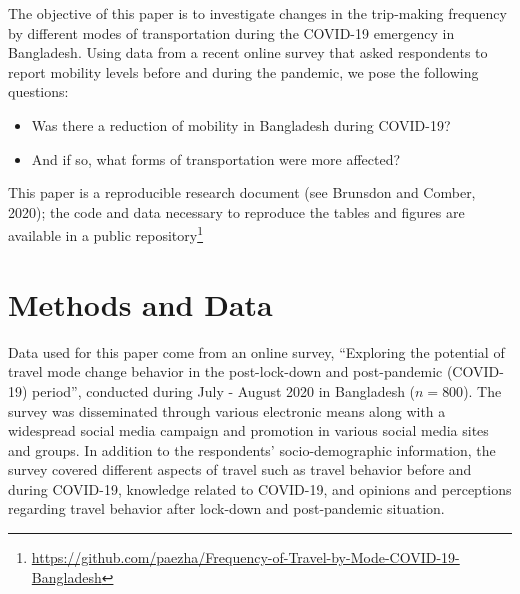 \documentclass[]{elsarticle} %
\providecommand{\tightlist}{%
  \setlength{\itemsep}{0pt}\setlength{\parskip}{0pt}}
\begin{document}
The objective of this paper is to investigate changes in the trip-making
frequency by different modes of transportation during the COVID-19
emergency in Bangladesh. Using data from a recent online survey that
asked respondents to report mobility levels before and during the
pandemic, we pose the following questions:

\begin{itemize}
\tightlist
\item
  Was there a reduction of mobility in Bangladesh during COVID-19?
\item
  And if so, what forms of transportation were more affected?
\end{itemize}

This paper is a reproducible research document (see Brunsdon and Comber,
2020); the code and data necessary to reproduce the tables and figures
are available in a public
repository\footnote{\url{https://github.com/paezha/Frequency-of-Travel-by-Mode-COVID-19-Bangladesh}}

\hypertarget{methods-and-data}{%
\section{Methods and Data}\label{methods-and-data}}

Data used for this paper come from an online survey, ``Exploring the
potential of travel mode change behavior in the post-lock-down and
post-pandemic (COVID-19) period'', conducted during July - August 2020
in Bangladesh (\(n=800\)). The survey was disseminated through various
electronic means along with a widespread social media campaign and
promotion in various social media sites and groups. In addition to the
respondents' socio-demographic information, the survey covered different
aspects of travel such as travel behavior before and during COVID-19,
knowledge related to COVID-19, and opinions and perceptions regarding
travel behavior after lock-down and post-pandemic situation.
\end{document}
